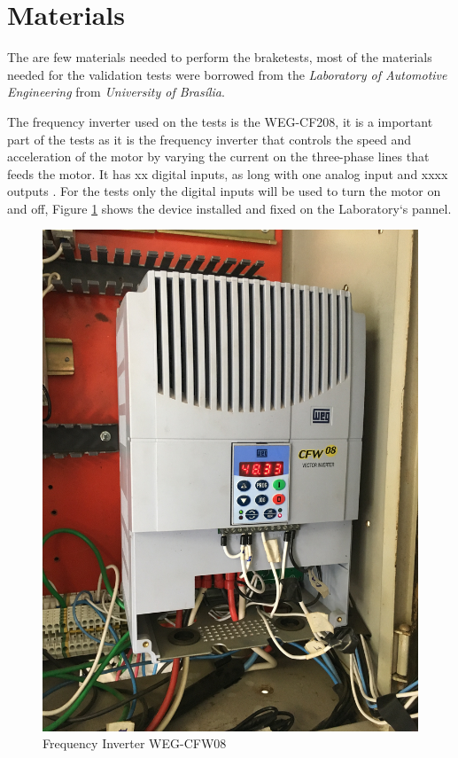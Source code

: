 \section{Materials}\label{sec:materials}
		The are few materials needed to perform the braketests, most of the materials needed for the validation tests were borrowed from the \textit{Laboratory of Automotive Engineering} from \textit{University of Brasília}.
		\par
		The frequency inverter used on the tests is the WEG-CF208, it is a important part of the tests as it is the frequency inverter that controls the speed and acceleration of the motor by varying the current on the three-phase lines that feeds the motor. It has xx digital inputs, as long with one analog input and xxxx outputs \cite{weg-CFW08}. For the tests only the digital inputs will be used to turn the motor on and off, Figure \ref{fig:frequency-inverter} shows the device installed and fixed on the Laboratory`s pannel.

		\begin{figure}[htbp]
			\centering
			\includegraphics[scale=0.05]{figuras/fig-frequency-inverter}
			\caption{Frequency Inverter WEG-CFW08}
			\label{fig:frequency-inverter}
		\end{figure}
		\par

